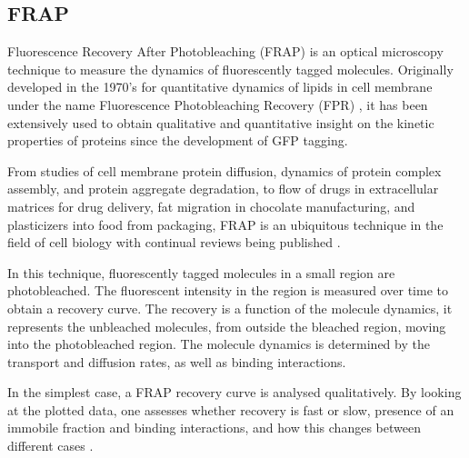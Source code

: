   \subsection{FRAP}

    Fluorescence Recovery After Photobleaching (FRAP) is an optical
    microscopy technique to measure the dynamics of fluorescently
    tagged molecules.
    Originally developed in the 1970's for quantitative dynamics of lipids
    in cell membrane under the name Fluorescence Photobleaching
    Recovery (FPR) \citep{axelrod1976mobility}, it has
    been extensively used to obtain qualitative and quantitative
    insight on the kinetic properties of proteins since the development
    of GFP tagging.

    From studies of cell membrane protein diffusion, dynamics of
    protein complex assembly, and protein aggregate degradation, to
    flow of drugs in extracellular matrices for drug delivery, fat
    migration in chocolate manufacturing, and plasticizers into food
    from packaging, FRAP is an ubiquitous technique in the field of
    cell biology with continual reviews being published
    \citep{frap-review-2005,mcnally-frap-2010,frap-review-2015}.

    In this technique, fluorescently tagged molecules in a small region
    are photobleached.  The fluorescent intensity in the region is
    measured over time to obtain a recovery curve.  The recovery is a
    function of the molecule dynamics, it represents the unbleached
    molecules, from outside the bleached region, moving into the
    photobleached region.  The molecule dynamics is determined by the
    transport and diffusion rates, as well as binding interactions.

    In the simplest case, a FRAP recovery curve is analysed
    qualitatively.  By looking at the plotted data, one assesses
    whether recovery is fast or slow, presence of an immobile
    fraction and binding interactions, and how this changes
    between different cases .

